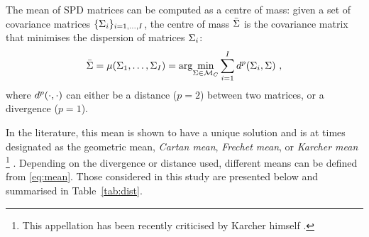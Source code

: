 The mean of SPD matrices can be computed as a centre of mass:
given a set of covariance matrices $\{\Sigma_{i}\}_{i=1,\dots,I}$,
the centre of mass $\bar{\Sigma}$ is the covariance matrix that minimises the dispersion of matrices $\Sigma_{i}$: %
\begin{equation}
	\label{eq:mean}
	\Pm = \Rm(\P_1, \dots, \P_\Nb) = \argmin_{\P \in \Ma} \sum_{\nb=1}^{\Nb} \dist^p(\P_\nb,\P) \ ,
\end{equation}
where $d^p(\cdot,\cdot)$ can either be a distance ($p=2$) between two matrices, or a divergence ($p=1$). %

In the literature, this mean is shown to have a unique solution and is at times designated as the geometric mean, \emph{Cartan mean}, \emph{Frechet mean}, or \emph{Karcher mean} \footnote{This appellation has been recently criticised by Karcher himself \cite{karcher_riemannian_2014}.} \cite{ando2004geometric,lim_matrix_2012}.
Depending on the divergence or distance used, different means can be defined from \eqref{eq:mean}. 
Those considered in this study are presented below and summarised in Table~\ref{tab:dist}.


